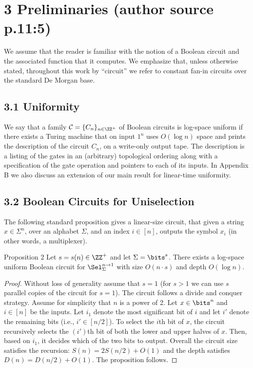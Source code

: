 \section*{3 Preliminaries (author source p.11:5)}
We assume that the reader is familiar with the notion of a Boolean circuit and the associated function that it computes. We emphasize that, unless otherwise stated, throughout this work by ``circuit'' we refer to constant fan-in circuits over the standard De Morgan base.
\subsection*{3.1 Uniformity}
We say that a family $\mathcal C=\{C_n\}_{n\in\ZZ^+}$ of Boolean circuits is log-space uniform if there exists a Turing machine that on input $1^n$ uses $O(\log n)$ space and prints the description of the circuit $C_n$, on a write-only output tape. The description is a listing of the gates in an (arbitrary) topological ordering along with a specification of the gate operation and pointers to each of its inputs. In Appendix B we also discuss an extension of our main result for linear-time uniformity.
\subsection*{3.2 Boolean Circuits for Uniselection}
The following standard proposition gives a linear-size circuit, that given a string $x\in\Sigma^n$, over an alphabet $\Sigma$, and an index $i\in[n]$, outputs the symbol $x_i$ (in other words, a multiplexer).
\begin{originalresult}{Proposition 2}
Let $s=s(n)\in\ZZ^+$ and let $\Sigma=\bits^s$. There exists a log-space uniform Boolean circuit for $\Sel_\Sigma^{n\to1}$ with size $O(n\cdot s)$ and depth $O(\log n)$.
\end{originalresult}
\begin{proof}
Without loss of generality assume that $s=1$ (for $s>1$ we can use $s$ parallel copies of the circuit for $s=1$). The circuit follows a divide and conquer strategy. Assume for simplicity that $n$ is a power of 2. Let $x\in\bits^n$ and $i\in[n]$ be the inputs. Let $i_1$ denote the most significant bit of $i$ and let $i'$ denote the remaining bits (i.e., $i'\in[n/2]$). To select the $i$th bit of $x$, the circuit recursively selects the $(i')$th bit of both the lower and upper halves of $x$. Then, based on $i_1$, it decides which of the two bits to output. Overall the circuit size satisfies the recursion: $S(n)=2S(n/2)+O(1)$ and the depth satisfies $D(n)=D(n/2)+O(1)$. The proposition follows.
\end{proof}
